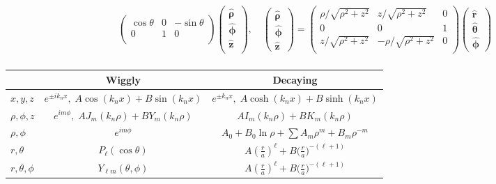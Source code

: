 \documentclass[10pt]{article}
\newcommand{\rhat}{\boldsymbol{\hat{\textbf{r}}}}
\newcommand{\zhat}{\boldsymbol{\hat{\textbf{z}}}}
\newcommand{\phihat}{\boldsymbol{\hat{\textbf{$\phi$}}}}
\newcommand{\thetahat}{\boldsymbol{\hat{\textbf{$\theta$}}}}
\newcommand{\rhohat}{\boldsymbol{\hat{\textbf{$\rho$}}}}
\begin{document}
\begin{multicols}{2}
\begin{align*}
\begin{pmatrix}
 			\cos \theta & 0 & -\sin \theta \\
 			0 & 1 & 0 \\
 		\end{pmatrix}
 		\begin{pmatrix}
 			\rhohat \\
 			\phihat \\
 			\zhat \\
 		\end{pmatrix}, \quad 
 		\begin{pmatrix}
			\rhohat \\
			\phihat \\
			\zhat
 		\end{pmatrix} = 
 		\begin{pmatrix}
 			\rho / \sqrt{\rho^2 + z^2} & z / \sqrt{\rho^2 + z^2} & 0 \\
 			0 & 0 & 1 \\
 			z / \sqrt{\rho^2 + z^2} & - \rho /\sqrt{\rho^2 + z^2} & 0 \\
 		\end{pmatrix}
 		\begin{pmatrix}
			\rhat \\
			\thetahat \\
			\phihat
 		\end{pmatrix} \\
 	\end{align*}
	\renewcommand{\arraystretch}{2}
	\begin{tabular}{| l | c | c |} \hline
		& Wiggly & Decaying \\ \hline
		$x,y,z$ &$ e^{\pm i k_n x}, \; A \cos(k_n x) + B\sin(k_n x)$ & $e^{\pm k_n x}, \; A \cosh( k_n x) + B \sinh(k_n x)$ \\ \hline
		$\rho,\phi,z$ & $e^{i m \phi}, \; A J_m(k_n \rho) + B Y_m(k_n \rho)$ & $ A I_m(k_n \rho) + B K_m(k_n \rho)$ \\ \hline
		$\rho,\phi$ & $e^{i m \phi}$ & $A_0 + B_0 \ln \rho + \sum A_m \rho^m + B_m \rho^{-m}$ \\ \hline
		$r,\theta$ & $P_\ell(\cos \theta)$ & $A \left( \frac{r}{a} \right)^\ell + B \big( \frac{r}{a} \big)^{-(\ell+1)} $ \\ \hline
		$r, \theta, \phi$ & $Y_{\ell m}(\theta, \phi)$ &  $A \left( \frac{r}{a} \right)^\ell + B \big( \frac{r}{a} \big)^{-(\ell+1)} $ \\ \hline
	\end{tabular}
\end{multicols}
 
\end{document}

